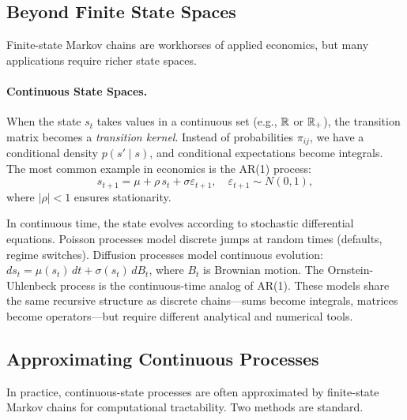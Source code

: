 \subsection{Beyond Finite State Spaces}
\label{subsec:continuous-extensions}

Finite-state Markov chains are workhorses of applied economics, but many applications require richer state spaces.

\paragraph{Continuous State Spaces.}
When the state $s_t$ takes values in a continuous set (e.g., $\mathbb{R}$ or $\mathbb{R}_+$), the transition matrix becomes a \emph{transition kernel}. Instead of probabilities $\pi_{ij}$, we have a conditional density $p(s' \mid s)$, and conditional expectations become integrals. The most common example in economics is the AR(1) process:
\begin{equation}
s_{t+1} = \mu + \rho \, s_t + \sigma \varepsilon_{t+1}, \quad \varepsilon_{t+1} \sim N(0, 1),
\label{eq:ar1}
\end{equation}
where $|\rho| < 1$ ensures stationarity. 

\begin{calloutnote}
In continuous time, the state evolves according to stochastic differential equations. Poisson processes model discrete jumps at random times (defaults, regime switches). Diffusion processes model continuous evolution: $ds_t = \mu(s_t) \, dt + \sigma(s_t) \, dB_t$, where $B_t$ is Brownian motion. The Ornstein-Uhlenbeck process is the continuous-time analog of AR(1). These models share the same recursive structure as discrete chains---sums become integrals, matrices become operators---but require different analytical and numerical tools.
\end{calloutnote}

\subsection{Approximating Continuous Processes}
\label{subsec:approximations}

In practice, continuous-state processes are often approximated by finite-state Markov chains for computational tractability. Two methods are standard.

